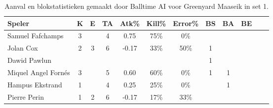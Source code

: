 \begin{table}[ht!]
  \centering
  \scriptsize
  \begin{tabular}{|l|c|c|c|c|c|c|c|c|c|c|c|} \hline
    \textbf{Speler} & K & E & TA & Atk\% & Kill\% & Error\% & BS & BA & BE \\ \hline
    Samuel Fafchamps & 3 &  & 4 & 0.75 & 75\%& 0\% &  &  & \\
    Jolan Cox & 2 & 3 & 6 & -0.17 & 33\% & 50\% & 1 &  &  \\
    Dawid Pawlun &   &   &   &   &   &   &  1 &  &   \\
    Miquel Angel Fornés & 3 &  & 5 & 0.60 & 60\% & 0\% & 1 & 1 & \\
    Hampus Ekstrand & 1 &  & 4 & 0.25 & 25\% & 0\% &  & 1 & \\
    Pierre Perin & 1 & 2 & 6 & -0.17 & 17\% & 33\% &  &   &  \\ \hline
    \end{tabular}
  \caption[Aanvals- en blokstatistieken gemaakt door Balltime AI voor Greenyard Maaseik in set 1]{\label{tab:PL1AttBlockMaaseik1}Aanval en blokstatistieken gemaakt door Balltime AI voor Greenyard Maaseik in set 1.}
\end{table}
